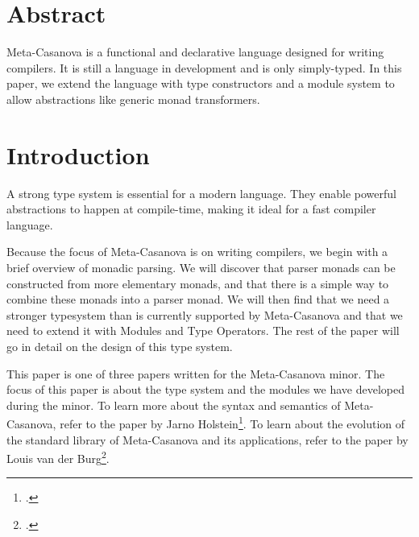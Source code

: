 \section*{Abstract}
Meta-Casanova is a functional and declarative language designed for writing compilers. 
It is still a language in development and is only simply-typed.
In this paper, we extend the language with type constructors and a module system to allow abstractions like generic monad transformers.
\section{Introduction}
A strong type system is essential for a modern language.
They enable powerful abstractions to happen at compile-time,
making it ideal for a fast compiler language.

Because the focus of Meta-Casanova is on writing compilers,
we begin with a brief overview of monadic parsing.
We will discover that parser monads can be constructed from more elementary monads,
and that there is a simple way to combine these monads into a parser monad.
We will then find that we need a stronger typesystem than is currently supported by Meta-Casanova
and that we need to extend it with Modules and Type Operators.
The rest of the paper will go in detail on the design of this type system.

This paper is one of three papers written for the Meta-Casanova minor.
The focus of this paper is about the type system and the modules we have developed during the minor.
To learn more about the syntax and semantics of Meta-Casanova, refer to the paper by Jarno Holstein\footcite{holstein16}.
To learn about the evolution of the standard library of Meta-Casanova and its applications, refer to the paper by Louis van der Burg\footcite{vanderburg16}.

